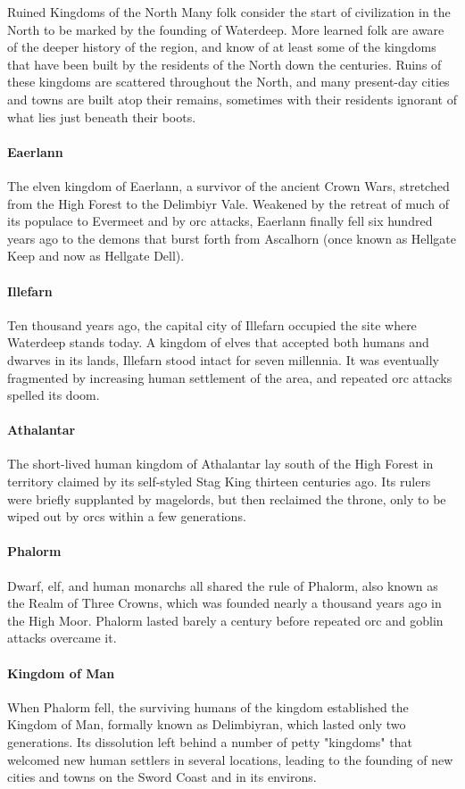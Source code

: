 \documentclass[10pt,a4paper,twoside,twocolumn,openany,bg=print,nodeprecatedcode]{dndbook}
\begin{document}
\begin{DndComment}{Ruined Kingdoms of the North}
Many folk consider the start of civilization in the North to be marked by the founding of Waterdeep. More learned folk are aware of the deeper history of the region, and know of at least some of the kingdoms that have been built by the residents of the North down the centuries.
Ruins of these kingdoms are scattered throughout the North, and many present-day cities and towns are built atop their remains, sometimes with their residents ignorant of what lies just beneath their boots.
\paragraph{Eaerlann}
The elven kingdom of Eaerlann, a survivor of the ancient Crown Wars, stretched from the High Forest to the Delimbiyr Vale. Weakened by the retreat of much of its populace to Evermeet and by orc attacks, Eaerlann finally fell six hundred years ago to the demons that burst forth from Ascalhorn (once known as Hellgate Keep and now as Hellgate Dell).
\paragraph{Illefarn}
Ten thousand years ago, the capital city of Illefarn occupied the site where Waterdeep stands today. A kingdom of elves that accepted both humans and dwarves in its lands, Illefarn stood intact for seven millennia. It was eventually fragmented by increasing human settlement of the area, and repeated orc attacks spelled its doom.
\paragraph{Athalantar}
The short-lived human kingdom of Athalantar lay south of the High Forest in territory claimed by its self-styled Stag King thirteen centuries ago. Its rulers were briefly supplanted by magelords, but then reclaimed the throne, only to be wiped out by orcs within a few generations.
\paragraph{Phalorm}
Dwarf, elf, and human monarchs all shared the rule of Phalorm, also known as the Realm of Three Crowns, which was founded nearly a thousand years ago in the High Moor. Phalorm lasted barely a century before repeated orc and goblin attacks overcame it.
\paragraph{Kingdom of Man}
When Phalorm fell, the surviving humans of the kingdom established the Kingdom of Man, formally known as Delimbiyran, which lasted only two generations. Its dissolution left behind a number of petty "kingdoms" that welcomed new human settlers in several locations, leading to the founding of new cities and towns on the Sword Coast and in its environs.

\end{DndComment}
\end{document}
